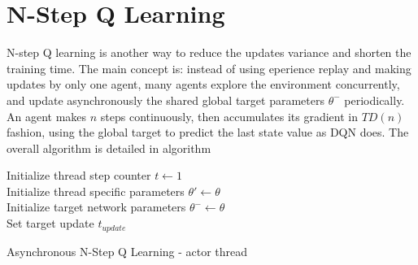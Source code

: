 \documentclass[10pt,a4paper,draft]{article}
\begin{document}
\section{N-Step Q Learning}
N-step Q learning \cite{nstepq2016} is another way to reduce the updates variance and shorten the training time. The main concept is: instead of using eperience replay and making updates by only one agent, many agents explore the environment concurrently, and update asynchronously the shared global target parameters $\theta^-$  periodically. An agent makes $n$ steps continuously, then accumulates its gradient in $TD(n)$ fashion, using the global target to predict the last state value as DQN does. The overall algorithm is detailed in algorithm

\begin{algorithm}[H]
	\SetAlgoLined
	\DontPrintSemicolon
	\KwResult{$\theta$}
	Initialize thread step counter $t \leftarrow 1$ \\
	Initialize thread specific parameters  $\theta' \leftarrow \theta$ \\ 
	Initialize target network parameters  $\theta^- \leftarrow \theta$ \\ 
	Set target update $t_{update}$ \\ 
	\caption{Asynchronous N-Step Q Learning - actor thread}
 	\label{async-n-step-alg}
\end{algorithm}
\end{document}
